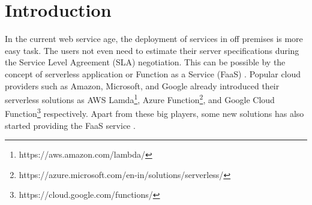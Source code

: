 

\chapter{Introduction} %

\label{Chapter 1} %



In the current web service age, the deployment of services in off premises is more easy task. The users not even need to estimate their server specifications during the Service Level Agreement (SLA) negotiation. This can be possible by the concept of serverless application or Function as a Service (FaaS) \cite{Wang_usenix_2018}. Popular cloud providers such as Amazon, Microsoft, and Google already introduced their serverless solutions as AWS Lamda\footnote{https://aws.amazon.com/lambda/}, Azure Function\footnote{https://azure.microsoft.com/en-in/solutions/serverless/}, and Google Cloud Function\footnote{https://cloud.google.com/functions/} respectively. Apart from these big players, some new solutions has also started providing the FaaS service \cite{servelless_online_2019}.

